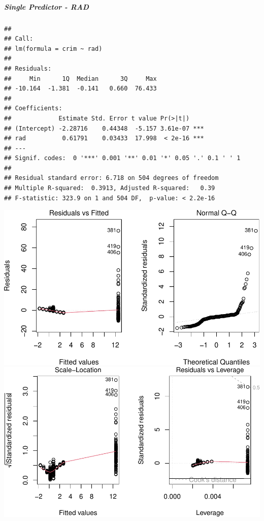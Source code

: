 \documentclass[
]{article}
\begin{document}
\hypertarget{single-predictor---rad}{%
\subparagraph{\texorpdfstring{\textbf{Single Predictor -
RAD}}{Single Predictor - RAD}}\label{single-predictor---rad}}

\begin{verbatim}
## 
## Call:
## lm(formula = crim ~ rad)
## 
## Residuals:
##     Min      1Q  Median      3Q     Max 
## -10.164  -1.381  -0.141   0.660  76.433 
## 
## Coefficients:
##             Estimate Std. Error t value Pr(>|t|)    
## (Intercept) -2.28716    0.44348  -5.157 3.61e-07 ***
## rad          0.61791    0.03433  17.998  < 2e-16 ***
## ---
## Signif. codes:  0 '***' 0.001 '**' 0.01 '*' 0.05 '.' 0.1 ' ' 1
## 
## Residual standard error: 6.718 on 504 degrees of freedom
## Multiple R-squared:  0.3913, Adjusted R-squared:   0.39 
## F-statistic: 323.9 on 1 and 504 DF,  p-value: < 2.2e-16
\end{verbatim}

\includegraphics{Disha_Gandhi_Take_Home_Exam_PDF_files/figure-latex/unnamed-chunk-25-1.pdf}
\includegraphics{Disha_Gandhi_Take_Home_Exam_PDF_files/figure-latex/unnamed-chunk-25-2.pdf}
\end{document}
